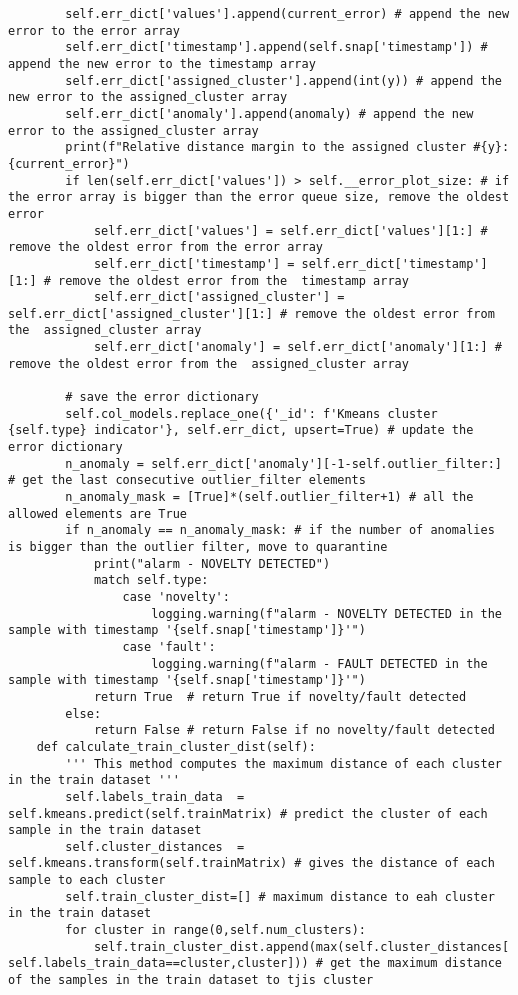 \begin{verbatim}
        self.err_dict['values'].append(current_error) # append the new error to the error array
        self.err_dict['timestamp'].append(self.snap['timestamp']) # append the new error to the timestamp array
        self.err_dict['assigned_cluster'].append(int(y)) # append the new error to the assigned_cluster array
        self.err_dict['anomaly'].append(anomaly) # append the new error to the assigned_cluster array
        print(f"Relative distance margin to the assigned cluster #{y}: {current_error}")
        if len(self.err_dict['values']) > self.__error_plot_size: # if the error array is bigger than the error queue size, remove the oldest error
            self.err_dict['values'] = self.err_dict['values'][1:] # remove the oldest error from the error array
            self.err_dict['timestamp'] = self.err_dict['timestamp'][1:] # remove the oldest error from the  timestamp array
            self.err_dict['assigned_cluster'] = self.err_dict['assigned_cluster'][1:] # remove the oldest error from the  assigned_cluster array
            self.err_dict['anomaly'] = self.err_dict['anomaly'][1:] # remove the oldest error from the  assigned_cluster array
        
        # save the error dictionary
        self.col_models.replace_one({'_id': f'Kmeans cluster {self.type} indicator'}, self.err_dict, upsert=True) # update the error dictionary
        n_anomaly = self.err_dict['anomaly'][-1-self.outlier_filter:] # get the last consecutive outlier_filter elements
        n_anomaly_mask = [True]*(self.outlier_filter+1) # all the allowed elements are True
        if n_anomaly == n_anomaly_mask: # if the number of anomalies is bigger than the outlier filter, move to quarantine
            print("alarm - NOVELTY DETECTED")
            match self.type:
                case 'novelty':
                    logging.warning(f"alarm - NOVELTY DETECTED in the sample with timestamp '{self.snap['timestamp']}'")
                case 'fault':
                    logging.warning(f"alarm - FAULT DETECTED in the sample with timestamp '{self.snap['timestamp']}'")
            return True  # return True if novelty/fault detected
        else:
            return False # return False if no novelty/fault detected
    def calculate_train_cluster_dist(self):
        ''' This method computes the maximum distance of each cluster in the train dataset '''
        self.labels_train_data  = self.kmeans.predict(self.trainMatrix) # predict the cluster of each sample in the train dataset
        self.cluster_distances  = self.kmeans.transform(self.trainMatrix) # gives the distance of each sample to each cluster
        self.train_cluster_dist=[] # maximum distance to eah cluster in the train dataset
        for cluster in range(0,self.num_clusters):
            self.train_cluster_dist.append(max(self.cluster_distances[ self.labels_train_data==cluster,cluster])) # get the maximum distance of the samples in the train dataset to tjis cluster
        

\end{verbatim}
